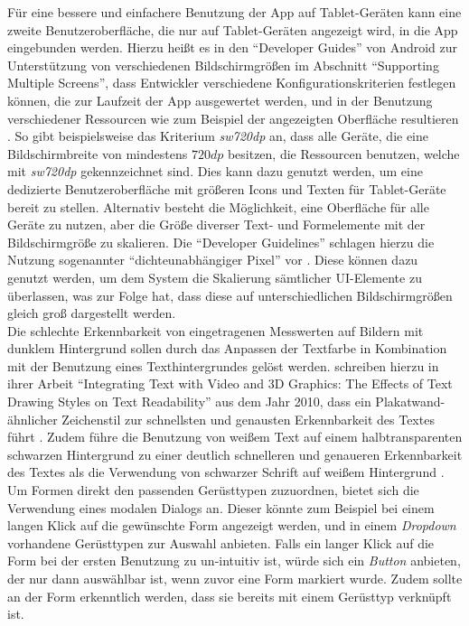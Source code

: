 Für eine bessere und einfachere Benutzung der App auf Tablet-Geräten kann eine zweite Benutzeroberfläche, die nur auf Tablet-Geräten angezeigt wird, in die App eingebunden werden. 
Hierzu heißt es in  den ``Developer Guides'' von Android zur Unterstützung von verschiedenen Bildschirmgrößen im Abschnitt ``Supporting Multiple Screens'', dass Entwickler verschiedene Konfigurationskriterien festlegen können, die zur Laufzeit der App ausgewertet werden, und in der Benutzung verschiedener Ressourcen wie zum Beispiel der angezeigten Oberfläche resultieren \citep[How to Support Multiple Screens]{SS18}.
So gibt beispielsweise das Kriterium \emph{sw720dp} an, dass alle Geräte, die eine Bildschirmbreite von mindestens $720dp$ besitzen, die Ressourcen benutzen, welche mit \emph{sw720dp} gekennzeichnet sind.
Dies kann dazu genutzt werden, um eine dedizierte Benutzeroberfläche mit größeren Icons und Texten für Tablet-Geräte bereit zu stellen.
Alternativ besteht die Möglichkeit, eine Oberfläche für alle Geräte zu nutzen, aber die Größe diverser Text- und Formelemente mit der Bildschirmgröße zu skalieren.
Die ``Developer Guidelines'' schlagen hierzu die Nutzung sogenannter ``dichteunabhängiger Pixel'' vor \citep[Density Independence]{SS18}.
Diese können dazu genutzt werden, um dem System die Skalierung sämtlicher UI-Elemente zu überlassen, was zur Folge hat, dass diese auf unterschiedlichen Bildschirmgrößen gleich groß dargestellt werden.
\\

Die schlechte Erkennbarkeit von eingetragenen Messwerten auf Bildern mit dunklem Hintergrund sollen durch das Anpassen der Textfarbe in Kombination mit der Benutzung eines Texthintergrundes gelöst werden.
\citeauthor{Jankowski10} schreiben hierzu in ihrer Arbeit ``Integrating Text with Video and 3D Graphics: The Effects of Text Drawing Styles on Text Readability'' aus dem Jahr 2010, dass ein Plakatwand-ähnlicher Zeichenstil zur schnellsten und genausten Erkennbarkeit des Textes führt \citep[Seite 1330]{Jankowski10}.
Zudem führe die Benutzung von weißem Text auf einem halbtransparenten schwarzen Hintergrund zu einer deutlich schnelleren und genaueren Erkennbarkeit des Textes als die Verwendung von schwarzer Schrift auf weißem Hintergrund \citep[Seite 1328]{Jankowski10}. \\

Um Formen direkt den passenden Gerüsttypen zuzuordnen, bietet sich die Verwendung eines modalen Dialogs an.
Dieser könnte zum Beispiel bei einem langen Klick auf die gewünschte Form angezeigt werden, und in einem \emph{Dropdown} vorhandene Gerüsttypen zur Auswahl anbieten.
Falls ein langer Klick auf die Form bei der ersten Benutzung zu un-intuitiv ist, würde sich ein \emph{Button} anbieten, der nur dann auswählbar ist, wenn zuvor eine Form markiert wurde.
Zudem sollte an der Form erkenntlich werden, dass sie bereits mit einem Gerüsttyp verknüpft ist. \\

